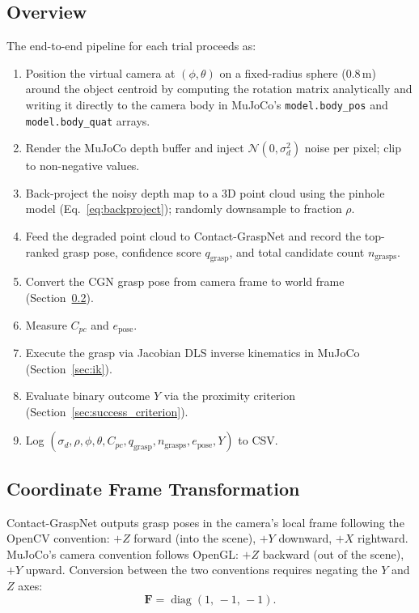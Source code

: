 \documentclass[journal]{IEEEtran}
\begin{document}
\subsection{Overview}

The end-to-end pipeline for each trial proceeds as:
\begin{enumerate}
  \item Position the virtual camera at $(\phi, \theta)$ on a
        fixed-radius sphere (0.8\,m) around the object centroid by
        computing the rotation matrix analytically and writing it
        directly to the camera body in MuJoCo's \texttt{model.body\_pos}
        and \texttt{model.body\_quat} arrays.
  \item Render the MuJoCo depth buffer and inject
        $\mathcal{N}(0, \sigma_d^2)$ noise per pixel; clip
        to non-negative values.
  \item Back-project the noisy depth map to a 3D point cloud using
        the pinhole model (Eq.~\ref{eq:backproject}); randomly
        downsample to fraction $\rho$.
  \item Feed the degraded point cloud to Contact-GraspNet and record
        the top-ranked grasp pose, confidence score $q_{\text{grasp}}$,
        and total candidate count $n_{\text{grasps}}$.
  \item Convert the CGN grasp pose from camera frame to world frame
        (Section~\ref{sec:frame_transform}).
  \item Measure $C_{pc}$ and $e_{\text{pose}}$.
  \item Execute the grasp via Jacobian DLS inverse kinematics in
        MuJoCo (Section~\ref{sec:ik}).
  \item Evaluate binary outcome $Y$ via the proximity criterion
        (Section~\ref{sec:success_criterion}).
  \item Log $(\sigma_d, \rho, \phi, \theta, C_{pc},
        q_{\text{grasp}}, n_{\text{grasps}}, e_{\text{pose}}, Y)$
        to CSV.
\end{enumerate}

\subsection{Coordinate Frame Transformation}
\label{sec:frame_transform}

Contact-GraspNet outputs grasp poses in the camera's local frame
following the OpenCV convention: $+Z$ forward (into the scene),
$+Y$ downward, $+X$ rightward.  MuJoCo's camera convention follows
OpenGL: $+Z$ backward (out of the scene), $+Y$ upward.  Conversion
between the two conventions requires negating the $Y$ and $Z$ axes:
\begin{equation}
  \mathbf{F} = \operatorname{diag}(1,\,-1,\,-1).
  \label{eq:flip}
\end{equation}
\end{document}
